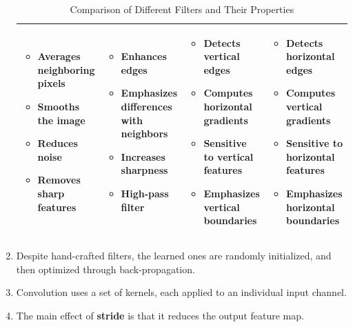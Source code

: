 \documentclass[12pt]{article}
\begin{document}
\begin{enumerate}
\begin{table}[h!]
\begin{tabular}{>{\raggedright}p{4cm}| >{\raggedright}p{4cm}| >{\raggedright}p{4cm}| >{\raggedright\arraybackslash}p{4cm}}
    \midrule
    
    \begin{itemize}
        \item Averages neighboring pixels
        \item Smooths the image
        \item Reduces noise
        \item Removes sharp features
    \end{itemize}
    &
    \begin{itemize}
        \item Enhances edges
        \item Emphasizes differences with neighbors
        \item Increases sharpness
        \item High-pass filter
    \end{itemize}
    &
    \begin{itemize}
        \item Detects vertical edges
        \item Computes horizontal gradients
        \item Sensitive to vertical features
        \item Emphasizes vertical boundaries
    \end{itemize}
    &
    \begin{itemize}
        \item Detects horizontal edges
        \item Computes vertical gradients
        \item Sensitive to horizontal features
        \item Emphasizes horizontal boundaries
    \end{itemize}
    \\
    
    \bottomrule
    \end{tabular}
    \caption{Comparison of Different Filters and Their Properties}
    \end{table}
    \item Despite hand-crafted filters, the learned ones are randomly initialized, and then optimized through back-propagation.

    \item Convolution uses a set of kernels, each applied to an individual input channel.

    \item The main effect of \textbf{stride} is that it reduces the output feature map.


\end{enumerate}
\end{document}
